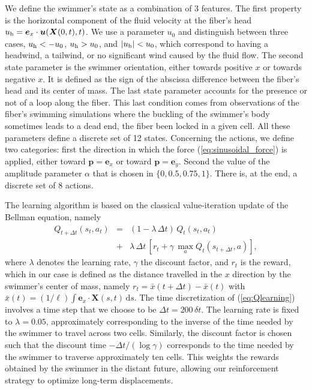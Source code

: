 \documentclass[aps,prl,preprint,groupedaddress]{revtex4-2}
\newcommand{\bX}{\bm X}
\newcommand{\bu}{\bm u}
\begin{document}
We define the swimmer's state as a combination of 3 features. The first property is the horizontal component of the fluid velocity at the fiber's head $u_{\rm h} = \bm e_x\cdot \bu(\bX(0,t),t)$. We use a parameter $u_0$ and distinguish between three cases, $u_{\rm h}<-u_0$, $u_{\rm h}>u_0$, and $|u_{\rm h}|<u_0$, which correspond to having a headwind, a tailwind, or no significant wind caused by the fluid flow. The second state parameter is the swimmer orientation, either towards positive $x$ or towards negative $x$. It is defined as the sign of the abscissa difference between the fiber's head and its center of mass. The last state parameter accounts for the presence or not of a loop along the fiber. This last condition comes from observations of the fiber's swimming simulations where the buckling of the swimmer's body sometimes leads to a dead end, the fiber been locked in a given cell. All these parameters define a discrete set of 12 states. Concerning the actions, we define two categories: first the direction in which the force (\ref{eq:sinusoidal_force}) is applied, either toward $\bm p = \bm e_{x}$ or toward $\bm p = \bm e_{y}$. Second the value of the amplitude parameter $\alpha$ that is chosen in $ \{0,0.5,0.75,1\}$. There is, at the end, a discrete set of 8 actions. 

The learning algorithm is based on the classical value-iteration update of the Bellman equation, namely
\begin{eqnarray}
    Q_{t+\Delta t}(s_t,a_t) &=& (1-\lambda\,\Delta t)\,Q_{t}(s_t,a_t) \nonumber\\
    &+& \lambda\,\Delta t\,\left[r_t + \gamma\,\max_a Q_{t}(s_{t+\Delta t},a) \right]\!,
    \label{eq:Qlearning}
\end{eqnarray}
where $\lambda$ denotes the learning rate, $\gamma$ the discount factor, and $r_t$ is the reward, which in our case is defined as the distance travelled in the $x$ direction by the swimmer's center of mass, namely $r_t = \bar{x}(t+\Delta t)-\bar{x}(t)$ with $\bar{x}(t) = (1/\ell) \int \bm e_x\cdot\bm X(s,t)\,\mathrm{d}s$. The time discretization of (\ref{eq:Qlearning}) involves a time step that we choose to be $\Delta t = 200\,\delta t$. The learning rate is fixed to $\lambda = 0.05$, approximately corresponding to the inverse of the time needed by the swimmer to travel across two cells. Similarly, the discount factor is chosen such that the discount time $-\Delta t / (\log \gamma)$ corresponds to the time needed by the swimmer to traverse approximately ten cells. This weights the rewards obtained by the swimmer in the distant future, allowing our reinforcement strategy to optimize long-term displacements.
\end{document}
